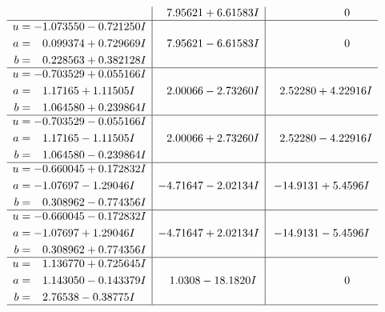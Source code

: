 \documentclass[1p]{elsarticle_modified}
\theoremstyle{definition}
\begin{document}
$$\begin{array}{c|c|c}
 & \phantom{-}7.95621 + 6.61583 I & \phantom{-0.000000 } 0 \\ \hline\begin{aligned}
u &= -1.073550 - 0.721250 I \\
a &= \phantom{-}0.099374 + 0.729669 I \\
b &= \phantom{-}0.228563 + 0.382128 I\end{aligned}
 & \phantom{-}7.95621 - 6.61583 I & \phantom{-0.000000 } 0 \\ \hline\begin{aligned}
u &= -0.703529 + 0.055166 I \\
a &= \phantom{-}1.17165 + 1.11505 I \\
b &= \phantom{-}1.064580 + 0.239864 I\end{aligned}
 & \phantom{-}2.00066 - 2.73260 I & \phantom{-}2.52280 + 4.22916 I \\ \hline\begin{aligned}
u &= -0.703529 - 0.055166 I \\
a &= \phantom{-}1.17165 - 1.11505 I \\
b &= \phantom{-}1.064580 - 0.239864 I\end{aligned}
 & \phantom{-}2.00066 + 2.73260 I & \phantom{-}2.52280 - 4.22916 I \\ \hline\begin{aligned}
u &= -0.660045 + 0.172832 I \\
a &= -1.07697 - 1.29046 I \\
b &= \phantom{-}0.308962 - 0.774356 I\end{aligned}
 & -4.71647 - 2.02134 I & -14.9131 + 5.4596 I \\ \hline\begin{aligned}
u &= -0.660045 - 0.172832 I \\
a &= -1.07697 + 1.29046 I \\
b &= \phantom{-}0.308962 + 0.774356 I\end{aligned}
 & -4.71647 + 2.02134 I & -14.9131 - 5.4596 I \\ \hline\begin{aligned}
u &= \phantom{-}1.136770 + 0.725645 I \\
a &= \phantom{-}1.143050 - 0.143379 I \\
b &= \phantom{-}2.76538 - 0.38775 I\end{aligned}
 & \phantom{-}1.0308 - 18.1820 I & \phantom{-0.000000 } 0\\
 \hline 
 \end{array}$$\newpage$$\begin{array}{c|c|c}  

\end{array}$$
\end{document}
